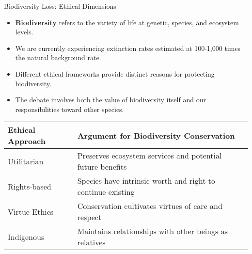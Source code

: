 \documentclass{beamer}
\begin{document}
	\begin{frame}{Biodiversity Loss: Ethical Dimensions}
		\begin{itemize}
			\item \textbf{Biodiversity} refers to the variety of life at genetic, species, and ecosystem levels.
			\item We are currently experiencing extinction rates estimated at 100-1,000 times the natural background rate.
			\item Different ethical frameworks provide distinct reasons for protecting biodiversity.
			\item The debate involves both the value of biodiversity itself and our responsibilities toward other species.
		\end{itemize}
		
		\begin{table}
			\scriptsize
			\begin{tabular}{|p{}|p{}|}
				\hline
				\textbf{Ethical Approach} & \textbf{Argument for Biodiversity Conservation} \\
				\hline
				Utilitarian & Preserves ecosystem services and potential future benefits \\
				\hline
				Rights-based & Species have intrinsic worth and right to continue existing \\
				\hline
				Virtue Ethics & Conservation cultivates virtues of care and respect \\
				\hline
				Indigenous & Maintains relationships with other beings as relatives \\
				\hline
			\end{tabular}
		\end{table}
	\end{frame}
	
\end{document}
